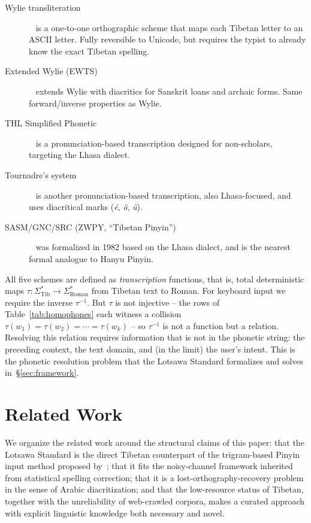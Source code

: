 \documentclass[11pt]{article}
\begin{document}
\begin{description}
\item[Wylie transliteration]~\cite{wylie1959} is a one-to-one orthographic scheme that maps each Tibetan letter to an ASCII letter. Fully reversible to Unicode, but requires the typist to already know the exact Tibetan spelling.
\item[Extended Wylie (EWTS)]~\cite{ewts} extends Wylie with diacritics for Sanskrit loans and archaic forms. Same forward/inverse properties as Wylie.
\item[THL Simplified Phonetic]~\cite{thl} is a pronunciation-based transcription designed for non-scholars, targeting the Lhasa dialect.
\item[Tournadre's system]~\cite{tournadre2003} is another pronunciation-based transcription, also Lhasa-focused, and uses diacritical marks (\textit{é}, \textit{ö}, \textit{ü}).
\item[SASM/GNC/SRC (ZWPY, ``Tibetan Pinyin'')]~\cite{sasm1982} was formalized in 1982 based on the Lhasa dialect, and is the nearest formal analogue to Hanyu Pinyin.
\end{description}

All five schemes are defined as \emph{transcription} functions, that is, total deterministic maps $\tau: \Sigma_{\text{Tib}}^* \to \Sigma_{\text{Roman}}^*$ from Tibetan text to Roman. For keyboard input we require the inverse $\tau^{-1}$. But $\tau$ is not injective -- the rows of Table~\ref{tab:homophones} each witness a collision $\tau(w_1) = \tau(w_2) = \cdots = \tau(w_k)$ -- so $\tau^{-1}$ is not a function but a relation. Resolving this relation requires information that is not in the phonetic string: the preceding context, the text domain, and (in the limit) the user's intent. This is the phonetic resolution problem that the Lotsawa Standard formalizes and solves in~\S\ref{sec:framework}.

\section{Related Work}
\label{sec:related}

We organize the related work around the structural claims of this paper: that the Lotsawa Standard is the direct Tibetan counterpart of the trigram-based Pinyin input method proposed by~\citet{chen2000pinyin}; that it fits the noisy-channel framework inherited from statistical spelling correction; that it is a lost-orthography-recovery problem in the sense of Arabic diacritization; and that the low-resource status of Tibetan, together with the unreliability of web-crawled corpora, makes a curated approach with explicit linguistic knowledge both necessary and novel.
\end{document}
